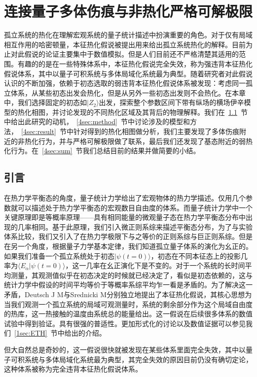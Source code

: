 \chapter{连接量子多体伤痕与非热化严格可解极限}\label{chap:ETH}

孤立系统的热化在理解宏观系统的量子统计描述中扮演重要的角色。对于仅有局域相互作用的哈密顿量，本征热化假说被提出用来给出孤立系统热化的解释。目前为止对此假说的论证主要集中于数值模拟。但是人们目前还不严格清楚其适用的范围。有趣的的是在一些特殊体系中，本征热化假说完全失效，称为强违背本征热化假说体系，其中以量子可积系统与多体局域化系统最为典型。随着研究者对此假说认识的不断加强，依赖于初态选取的弱违背本征热化假说体系被发现：考虑同一孤立体系，从某些初态出发会热化，但是从另外一些初态出发则不会热化。在本章中，我们选择固定的初态如$|Z_2\rangle$出发，探索整个参数区间下带有纵场的横场伊辛模型的热化相图，并讨论发现的不同热化区域及其背后的物理解释。我们在~\ref{4sec:intro}~节中给出此研究的动机，~\ref{4sec:method}~节中讨论涉及的模型和方法，~\ref{4sec:result}~节中针对得到的热化相图做分析，我们主要发现了多体伤痕附近的非热化行为，并与严格可解极限做了联系，最后我们还发现了基态附近的弱热化行为。在~\ref{4sec:sum}~节我们总结目前的结果并做简要的小结。

\section{引言}\label{4sec:intro}
在热力学平衡态的角度，量子统计力学给出了宏观物体的热力学描述。仅用几个参数就可以描述处于热力学平衡态的宏观数目自由度的体系。而量子统计力学中一个关键原理即是等概率原理——具有相同能量的微观量子态在热力学平衡态分布中出现的几率相同。基于此原理，我们引入微正则系综来描述平衡态分布，为了与实验体系比较，我们又引入了在热力学极限下与之等价的正则系综与巨正则系综。但是在另一个角度，根据量子力学基本定律，我们知道孤立量子体系的演化为幺正的。如果我们准备一个孤立系统处于初态$|\psi(t=0)\rangle$，初态在不同本征态上的投影几率为$\langle E_\alpha|\psi(t=0)\rangle$，这一几率在幺正演化下是不变的。对于一个系统的长时间平均测量，其观测值似乎在初态决定的时候就已经决定了，看似是初态依赖的，这与统计力学中假设的时间平均等价于等概率系综平均乍一看是矛盾的。为了解决这一矛盾，Deutsch J M\cite{Deutsch1991quantum}与Srednicki M\cite{Srednicki1994chaos}分别独立地提出了本征热化假说，其核心思想为当我们观测一个孤立系统的局域可观测量时，系统的剩余部分作为这个局域自由度的热库，这一热接触的温度由系统总的能量给出。这一假说在后续很多体系的数值试验中得到验证。具有很强的普适性。更加形式化的讨论以及数值证据可以参见我们~\ref{1sec:ETH}~节中给出的介绍。

但大自然总是奇妙的，这一假说很快就被发现在某些体系里面完全失效，其中以量子可积系统\cite{kinoshita2006quantum,Rigol2007Relaxation,Calabrese2011Quantum,essler2016quench,vidmar2016generalized}与多体局域化系统最为典型\cite{basko2006metal,Serbyn2013local,Huse2014Phenomenology}，其完全失效的原因目前仍没有确切定论，这种体系被称为完全违背本征热化假说体系。

